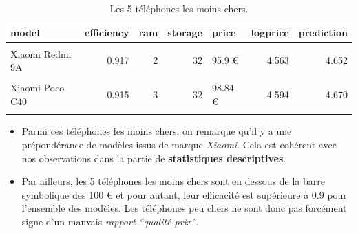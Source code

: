 \documentclass[
  12pt,
]{report}
\begin{document}
\begin{table}[!h]
\centering
\caption{\label{tab:kbl_expensive}Les 5 téléphones les moins chers.}
\centering
\begin{tabular}[t]{lrrrlrr}
\toprule
\textbf{model} & \textbf{efficiency} & \textbf{ram} & \textbf{storage} & \textbf{price} & \textbf{logprice} & \textbf{prediction}\\
\midrule
\cellcolor{gray!10}{Xiaomi Redmi A1} & \cellcolor{gray!10}{0.918} & \cellcolor{gray!10}{2} & \cellcolor{gray!10}{32} & \cellcolor{gray!10}{91.4 €} & \cellcolor{gray!10}{4.515} & \cellcolor{gray!10}{4.613}\\
Xiaomi Redmi 9A & 0.917 & 2 & 32 & 95.9 € & 4.563 & 4.652\\
\cellcolor{gray!10}{Xiaomi Redmi 9AT} & \cellcolor{gray!10}{0.932} & \cellcolor{gray!10}{2} & \cellcolor{gray!10}{32} & \cellcolor{gray!10}{96.91 €} & \cellcolor{gray!10}{4.574} & \cellcolor{gray!10}{4.776}\\
Xiaomi Poco C40 & 0.915 & 3 & 32 & 98.84 € & 4.594 & 4.670\\
\cellcolor{gray!10}{Motorola E13} & \cellcolor{gray!10}{0.914} & \cellcolor{gray!10}{2} & \cellcolor{gray!10}{64} & \cellcolor{gray!10}{99 €} & \cellcolor{gray!10}{4.595} & \cellcolor{gray!10}{4.664}\\
\bottomrule
\end{tabular}
\end{table}

\begin{itemize}
\item
  Parmi ces téléphones les moins chers, on remarque qu'il y a une
  prépondérance de modèles issus de marque \emph{Xiaomi}. Cela est
  cohérent avec nos observations dans la partie de \textbf{statistiques
  descriptives}.
\item
  Par ailleurs, les 5 téléphones les moins chers sont en dessous de la
  barre symbolique des 100 € et pour autant, leur efficacité est
  supérieure à \(0.9\) pour l'ensemble des modèles. Les téléphones peu
  chers ne sont donc pas forcément signe d'un mauvais \emph{rapport
  ``qualité-prix''}.
\end{itemize}
\end{document}
